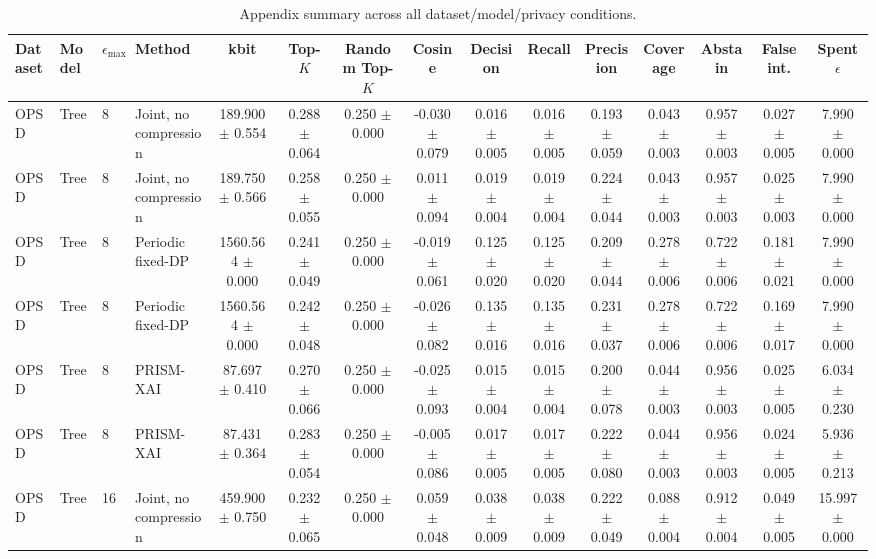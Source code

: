\begin{table}[t]
\caption{Appendix summary across all dataset/model/privacy conditions.}
\label{tab:appendix-conditions}
\centering
\scriptsize
\setlength{\tabcolsep}{2.5pt}
\begin{tabular}{llllccccccccccc}
\toprule
Dataset & Model & $\epsilon_{\max}$ & Method & kbit & Top-$K$ & Random Top-$K$ & Cosine & Decision & Recall & Precision & Coverage & Abstain & False int. & Spent $\epsilon$ \\
\midrule
OPSD & Tree & 8 & Joint, no compression & 189.900 $\pm$ 0.554 & 0.288 $\pm$ 0.064 & 0.250 $\pm$ 0.000 & -0.030 $\pm$ 0.079 & 0.016 $\pm$ 0.005 & 0.016 $\pm$ 0.005 & 0.193 $\pm$ 0.059 & 0.043 $\pm$ 0.003 & 0.957 $\pm$ 0.003 & 0.027 $\pm$ 0.005 & 7.990 $\pm$ 0.000 \\
OPSD & Tree & 8 & Joint, no compression & 189.750 $\pm$ 0.566 & 0.258 $\pm$ 0.055 & 0.250 $\pm$ 0.000 & 0.011 $\pm$ 0.094 & 0.019 $\pm$ 0.004 & 0.019 $\pm$ 0.004 & 0.224 $\pm$ 0.044 & 0.043 $\pm$ 0.003 & 0.957 $\pm$ 0.003 & 0.025 $\pm$ 0.003 & 7.990 $\pm$ 0.000 \\
OPSD & Tree & 8 & Periodic fixed-DP & 1560.564 $\pm$ 0.000 & 0.241 $\pm$ 0.049 & 0.250 $\pm$ 0.000 & -0.019 $\pm$ 0.061 & 0.125 $\pm$ 0.020 & 0.125 $\pm$ 0.020 & 0.209 $\pm$ 0.044 & 0.278 $\pm$ 0.006 & 0.722 $\pm$ 0.006 & 0.181 $\pm$ 0.021 & 7.990 $\pm$ 0.000 \\
OPSD & Tree & 8 & Periodic fixed-DP & 1560.564 $\pm$ 0.000 & 0.242 $\pm$ 0.048 & 0.250 $\pm$ 0.000 & -0.026 $\pm$ 0.082 & 0.135 $\pm$ 0.016 & 0.135 $\pm$ 0.016 & 0.231 $\pm$ 0.037 & 0.278 $\pm$ 0.006 & 0.722 $\pm$ 0.006 & 0.169 $\pm$ 0.017 & 7.990 $\pm$ 0.000 \\
OPSD & Tree & 8 & PRISM-XAI & 87.697 $\pm$ 0.410 & 0.270 $\pm$ 0.066 & 0.250 $\pm$ 0.000 & -0.025 $\pm$ 0.093 & 0.015 $\pm$ 0.004 & 0.015 $\pm$ 0.004 & 0.200 $\pm$ 0.078 & 0.044 $\pm$ 0.003 & 0.956 $\pm$ 0.003 & 0.025 $\pm$ 0.005 & 6.034 $\pm$ 0.230 \\
OPSD & Tree & 8 & PRISM-XAI & 87.431 $\pm$ 0.364 & 0.283 $\pm$ 0.054 & 0.250 $\pm$ 0.000 & -0.005 $\pm$ 0.086 & 0.017 $\pm$ 0.005 & 0.017 $\pm$ 0.005 & 0.222 $\pm$ 0.080 & 0.044 $\pm$ 0.003 & 0.956 $\pm$ 0.003 & 0.024 $\pm$ 0.005 & 5.936 $\pm$ 0.213 \\
OPSD & Tree & 16 & Joint, no compression & 459.900 $\pm$ 0.750 & 0.232 $\pm$ 0.065 & 0.250 $\pm$ 0.000 & 0.059 $\pm$ 0.048 & 0.038 $\pm$ 0.009 & 0.038 $\pm$ 0.009 & 0.222 $\pm$ 0.049 & 0.088 $\pm$ 0.004 & 0.912 $\pm$ 0.004 & 0.049 $\pm$ 0.005 & 15.997 $\pm$ 0.000 \\

\end{tabular}
\end{table}
